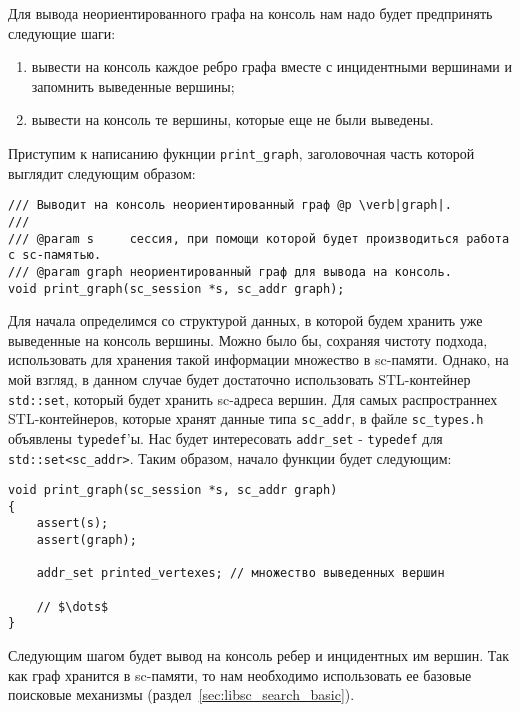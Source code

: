 Для вывода неориентированного графа на консоль нам надо будет
предпринять следующие шаги:
\begin{enumerate}
\item вывести на консоль каждое ребро графа вместе с инцидентными
  вершинами и запомнить выведенные вершины;
\item вывести на консоль те вершины, которые еще не были выведены.
\end{enumerate}

Приступим к написанию фукнции \lstinline|print_graph|, заголовочная
часть которой выглядит следующим образом:
\begin{lstlisting}[texcl]
/// Выводит на консоль неориентированный граф @p \verb|graph|.
///
/// @param s     сессия, при помощи которой будет производиться работа с sc-памятью.
/// @param graph неориентированный граф для вывода на консоль.
void print_graph(sc_session *s, sc_addr graph);
\end{lstlisting}

Для начала определимся со структурой данных, в которой будем хранить
уже выведенные на консоль вершины. Можно было бы, сохраняя чистоту
подхода, использовать для хранения такой информации множество в
sc-памяти. Однако, на мой взгляд, в данном случае будет достаточно
использовать STL-контейнер \lstinline|std::set|, который будет хранить
sc-адреса вершин. Для самых распространнех STL-контейнеров, которые
хранят данные типа \lstinline|sc_addr|, в файле \verb|sc_types.h|
объявлены \lstinline|typedef|'ы. Нас будет интересовать
\lstinline|addr_set| - \lstinline|typedef| для
\lstinline|std::set<sc_addr>|. Таким образом, начало функции
будет следующим:
\begin{lstlisting}[texcl]
void print_graph(sc_session *s, sc_addr graph)
{
    assert(s);
    assert(graph);

    addr_set printed_vertexes; // множество выведенных вершин

    // $\dots$
}
\end{lstlisting}

Следующим шагом будет вывод на консоль ребер и инцидентных им
вершин. Так как граф хранится в sc-памяти, то нам необходимо
использовать ее базовые поисковые механизмы
(раздел~\ref{sec:libsc_search_basic}).

